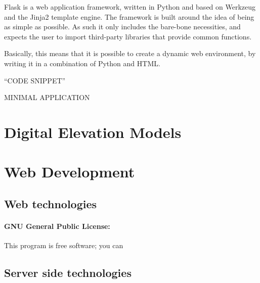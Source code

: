 Flask is a web application framework, written in Python and based on Werkzeug and the Jinja2 template engine. The framework is built around the idea of being as simple as possible. As such it only includes the bare-bone necessities, and expects the user to import third-party libraries that provide common functions. 

Basically, this means that it is possible to create a dynamic web environment, by writing it in a combination of Python and HTML. 

“CODE SNIPPET”

MINIMAL APPLICATION


\section{Digital Elevation Models}


\section{Web Development}
\subsection*{Web technologies}
\paragraph{GNU General Public License:} This program is free software; you can 

\subsection*{Server side technologies}
